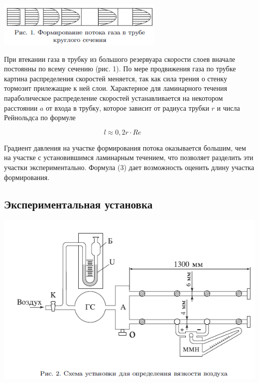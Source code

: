 \documentclass[a4paper, 12pt]{article} %
\begin{document}
\begin{center}
    \includegraphics[width = 0.6\textwidth]{133_1}
\end{center}

При втекании газа в трубку из большого резервуара скорости слоев вначале постоянны по всему сечению (рис. 1). По мере продвижения газа по трубке картина распределения скоростей меняется, так как сила трения о стенку тормозит прилежащие к ней слои. Характерное для ламинарного течения параболическое распределение скоростей устанавливается на некотором расстоянии $a$ от входа в трубку, которое зависит от радиуса трубки $r$ и числа Рейнольдса по формуле

\begin{equation}
    l \approx  0,2 r \cdot Re \text{ } \text{ } \text{ }
\end{equation}

Градиент давления на участке формирования потока оказывается большим, чем на участке с установившимся ламинарным течением, что позволяет разделить эти участки экспериментально. Формула (3) дает возможность оценить длину участка формирования.


\subsection{Экспериментальная установка}

\begin{center}
    \includegraphics[width = \textwidth]{133_2.png}
\end{center}
\end{document}
